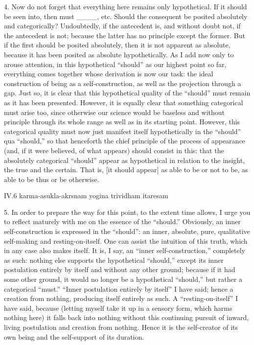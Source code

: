 4. Now do not forget that everything here
remains only hypothetical.
If it should be seen into, then must ____, etc.
Should the consequent be posited
absolutely and categorically?
Undoubtedly, if the antecedent is,
and without doubt not, if the antecedent is not;
because the latter has no principle except the former.
But if the first should be posited absolutely,
then it is not apparent as absolute,
because it has been posited as absolute hypothetically.
As I add now only to arouse attention,
in this hypothetical “should” as our highest point so far,
everything comes together whose derivation is now our task:
the ideal construction of being as a self-construction,
as well as the projection through a gap.
Just so, it is clear that this hypothetical quality
of the “should” must remain as it has been presented.
However, it is equally clear that
something categorical must arise too,
since otherwise our science would be baseless
and without principle through its whole range
as well as in its starting point.
However, this categorical quality
must now just manifest itself hypothetically
in the “should” qua “should,”
so that henceforth the chief principle
of the process of appearance
(and, if it were believed, of what appears)
should consist in this:
that the absolutely categorical “should”
appear as hypothetical in relation to the insight,
the true and the certain.
That is, [it should appear]
as able to be or not to be,
as able to be thus or be otherwise.

IV.6
karma-asukla-akrsnam yogina trividham itaresam

5. In order to prepare the way for this point,
to the extent time allows,
I urge you to reflect maturely with me
on the essence of the “should.”
Obviously, an inner self-construction is
expressed in the “should”:
an inner, absolute, pure, qualitative
self-making and resting-on-itself.
One can assist the intuition of this truth,
which in any case also makes itself.
It is, I say, an “inner self-construction,”
completely as such:
nothing else supports the hypothetical “should,”
except its inner postulation entirely by itself
and without any other ground;
because if it had some other ground,
it would no longer be a hypothetical “should,”
but rather a categorical “must.”
“Inner postulation entirely by itself”
I have said; hence a creation from nothing,
producing itself entirely as such.
A “resting-on-itself” I have said, because
(letting myself take it up in a sensory form,
which harms nothing here)
it falls back into nothing
without this continuing pursuit of
inward, living postulation
and creation from nothing.
Hence it is the self-creator of its own being
and the self-support of its duration.

